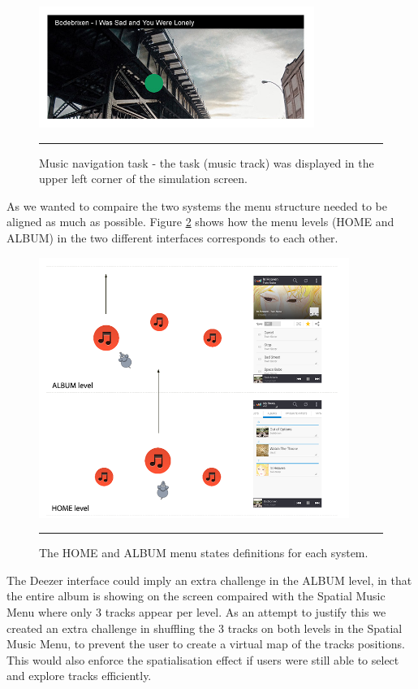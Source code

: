 \begin{figure}[t]
	\centering
		\includegraphics[width=0.8\textwidth,height=\textheight,keepaspectratio]{./Figures/simulation_musictask.jpg}
		\rule{35em}{1pt}
	\caption[Music navigation task]{Music navigation task - the task (music track) was displayed in the upper left corner of the simulation screen.}
	\label{fig:simulationmusictask}
\end{figure}

As we wanted to compaire the two systems the menu structure needed to be aligned as much as possible. Figure \ref{fig:menustates} shows how the menu levels (HOME and ALBUM) in the two different interfaces corresponds to each other.

\begin{figure}[t]
	\centering
		\includegraphics[width=0.9\textwidth,height=\textheight,keepaspectratio]{./Figures/menustates.png}
		\rule{35em}{1pt}
	\caption[Menu states comparison]{The HOME and ALBUM menu states definitions for each system.}
	\label{fig:menustates}
\end{figure}

The Deezer interface could imply an extra challenge in the ALBUM level, in that the entire album is showing on the screen compaired with the Spatial Music Menu where only 3 tracks appear per level. As an attempt to justify this we created an extra challenge in shuffling the 3 tracks on both levels in the Spatial Music Menu, to prevent the user to create a virtual map of the tracks positions. This would also enforce the spatialisation effect if users were still able to select and explore tracks efficiently.

